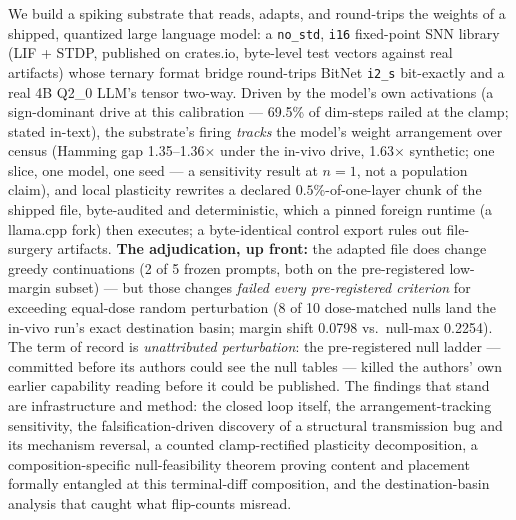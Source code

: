 We build a spiking substrate that reads, adapts, and round-trips the
weights of a shipped, quantized large language model: a
\texttt{no\_std}, \texttt{i16} fixed-point SNN library (LIF + STDP,
published on crates.io, byte-level test vectors against real
artifacts) whose ternary format bridge round-trips BitNet
\texttt{i2\_s} bit-exactly and a real 4B Q2\_0 LLM's tensor
two-way. Driven by the model's own activations (a sign-dominant drive
at this calibration --- 69.5\% of dim-steps railed at the clamp;
stated in-text), the substrate's firing \emph{tracks} the model's
weight arrangement over census (Hamming gap 1.35--1.36$\times$ under
the in-vivo drive, 1.63$\times$ synthetic; one slice, one model, one
seed --- a sensitivity result at $n{=}1$, not a population claim),
and local plasticity rewrites a declared $0.5\%$-of-one-layer
chunk of the shipped file, byte-audited and deterministic, which a
pinned foreign runtime (a llama.cpp fork) then executes; a
byte-identical control export rules out file-surgery artifacts.
\textbf{The adjudication, up front:} the adapted file does change
greedy continuations (2 of 5 frozen prompts, both on the
pre-registered low-margin subset) --- but those changes
\emph{failed every pre-registered criterion} for exceeding equal-dose
random perturbation (8 of 10 dose-matched nulls land the in-vivo
run's exact destination basin; margin shift 0.0798 vs.\ null-max
0.2254). The term of record is \emph{unattributed perturbation}:
the pre-registered null ladder --- committed before its authors could
see the null tables --- killed the authors' own earlier capability
reading before it could be published. The findings that stand are
infrastructure and method: the closed loop itself, the
arrangement-tracking sensitivity, the falsification-driven discovery
of a structural transmission bug and its mechanism reversal, a
counted clamp-rectified plasticity decomposition, a
composition-specific null-feasibility theorem proving content and
placement formally entangled at this terminal-diff composition, and
the destination-basin analysis that caught what flip-counts misread.
